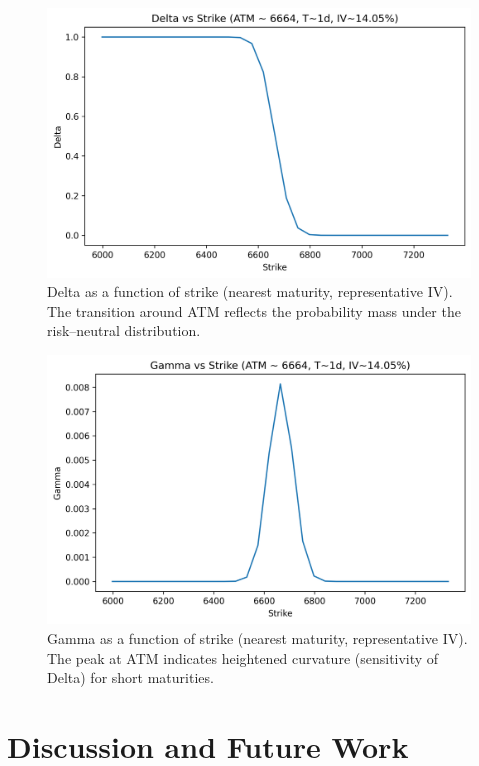 \documentclass[12pt]{article}
\begin{document}
\begin{figure}[H]
\centering
\includegraphics[width=0.85\linewidth]{delta_vs_strike.png}
\caption{Delta as a function of strike (nearest maturity, representative IV). The transition around ATM reflects
the probability mass under the risk--neutral distribution.}
\label{fig:delta}
\end{figure}

\begin{figure}[H]
\centering
\includegraphics[width=0.85\linewidth]{gamma_vs_strike.png}
\caption{Gamma as a function of strike (nearest maturity, representative IV). The peak at ATM indicates heightened
curvature (sensitivity of Delta) for short maturities.}
\label{fig:gamma}
\end{figure}

\FloatBarrier %

\section{Discussion and Future Work}
\end{document}
